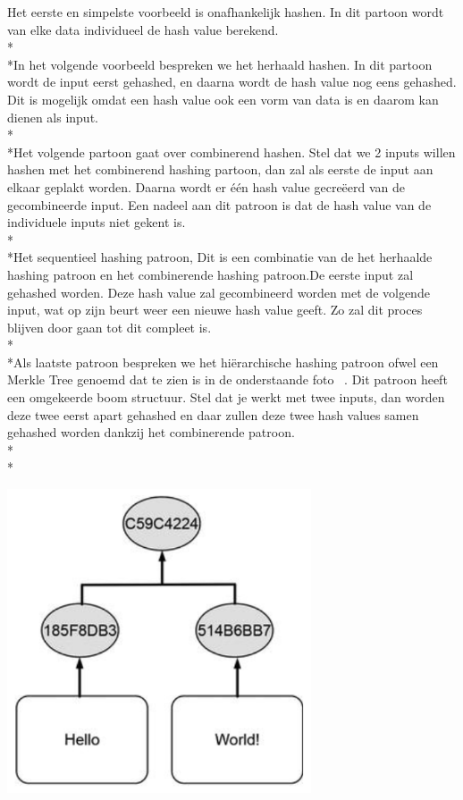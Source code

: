 \documentclass[fleqn,a4paper,12pt]{book}
\begin{document}
Het eerste en simpelste voorbeeld is onafhankelijk hashen. In dit partoon wordt van elke data individueel de hash value berekend.\\*\\*In het volgende voorbeeld bespreken we het herhaald hashen. In dit partoon wordt de input eerst gehashed, en daarna wordt de hash value nog eens gehashed. Dit is mogelijk omdat een hash value ook een vorm van data is en daarom kan dienen als input.\\*\\*Het volgende partoon gaat over combinerend hashen. Stel dat we 2 inputs willen hashen met het combinerend hashing partoon, dan zal als eerste de input aan elkaar geplakt worden. Daarna wordt er één hash value gecreëerd van de gecombineerde input. Een nadeel aan dit patroon is dat de hash value van de individuele inputs niet gekent is.\\*\\*Het sequentieel hashing patroon, Dit is een combinatie van de het herhaalde hashing patroon en het combinerende hashing patroon.De eerste input zal gehashed worden. Deze hash value zal gecombineerd worden met de volgende input, wat op zijn beurt weer een nieuwe hash value geeft. Zo zal dit proces blijven door gaan tot dit compleet is.\\*\\*Als laatste patroon bespreken we het hiërarchische hashing patroon ofwel een Merkle Tree genoemd dat te zien is in de onderstaande foto ~\autocite{blockchain1}. Dit patroon heeft een omgekeerde boom structuur. Stel dat je werkt met twee inputs, dan worden deze twee eerst apart gehashed en daar zullen deze twee hash values samen gehashed worden dankzij het combinerende patroon.\\*\\*
\begin{center}
	\includegraphics[width=9cm]{img/hashing2}\\[1cm]
\end{center}
\end{document}
